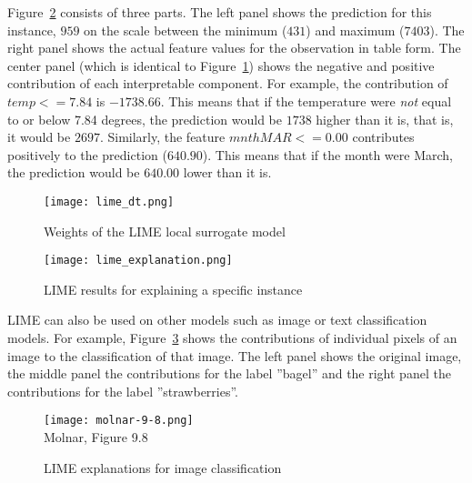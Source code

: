 \begin{textcode}
[('temp <= 7.84', -1738.6611673589232), 
 ('mnth_MAR <= 0.00', 640.903016649792), 
 ('weekday_THU <= 0.00', -532.3918204920352), 
 ('windspeed > 15.63', 493.90993722141997), 
 ('season_SPRING <= 0.00', -333.38496260796086)]
\end{textcode}

Figure~\ref{fig:limeexplanation} consists of three parts. The left panel shows the prediction for this instance, $959$ on the scale between the minimum ($431$) and maximum ($7403$). The right panel shows the actual feature values for the observation in table form. The center panel (which is identical to Figure~\ref{fig:limecontribs}) shows the negative and positive contribution of each interpretable component. For example, the contribution of $temp <= 7.84$ is $-1738.66$. This means that if the temperature were \emph{not} equal to or below 7.84 degrees, the prediction would be $1738$ higher than it is, that is, it would be $2697$. Similarly, the feature $mnth MAR <= 0.00$ contributes positively to the prediction ($640.90$). This means that if the month were March, the prediction would be $640.00$ lower than it is. 

\begin{figure}
\centering

\texttt{[image: lime\_dt.png]}
\caption{Weights of the LIME local surrogate model}
\label{fig:limecontribs}
\end{figure}

\begin{figure}
\centering

\texttt{[image: lime\_explanation.png]}
\caption{LIME results for explaining a specific instance}
\label{fig:limeexplanation}
\end{figure}

LIME can also be used on other models such as image or text classification models. For example, Figure~\ref{fig:molnar98} shows the contributions of individual pixels of an image to the classification of that image. The left panel shows the original image, the middle panel the contributions for the label ''bagel'' and the right panel the contributions for the label ''strawberries''. 

\begin{figure}
\centering
\texttt{[image: molnar-9-8.png]} \\

\scriptsize Molnar, Figure 9.8
\caption{LIME explanations for image classification}
\label{fig:molnar98}
\end{figure}

